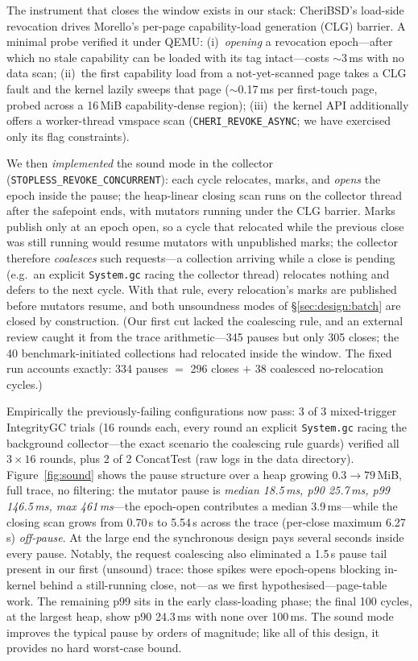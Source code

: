\documentclass[acmsmall,nonacm,screen]{acmart}
\begin{document}
The instrument that closes the window exists in our stack: CheriBSD's
load-side revocation drives Morello's per-page capability-load
generation (CLG) barrier. A minimal probe verified it under QEMU:
(i)~\emph{opening} a revocation epoch---after which no stale
capability can be loaded with its tag intact---costs $\sim$3\,ms
with no data scan; (ii)~the first capability load from a
not-yet-scanned page takes a CLG fault and the kernel lazily sweeps
that page ($\sim$0.17\,ms per first-touch page, probed across a
16\,MiB capability-dense region); (iii)~the kernel API additionally
offers a worker-thread vmspace scan (\texttt{CHERI\_REVOKE\_ASYNC};
we have exercised only its flag constraints).

We then \emph{implemented} the sound mode in the collector
(\texttt{STOPLESS\_REVOKE\_CONCURRENT}): each cycle relocates,
marks, and \emph{opens} the epoch inside the pause; the heap-linear
closing scan runs on the collector thread after the safepoint ends,
with mutators running under the CLG barrier. Marks publish only at an
epoch open, so a cycle that relocated while the previous close was
still running would resume mutators with unpublished marks; the
collector therefore \emph{coalesces} such requests---a collection
arriving while a close is pending (e.g.\ an explicit
\texttt{System.gc} racing the collector thread) relocates nothing and
defers to the next cycle. With that rule, every relocation's marks are
published before mutators resume, and both unsoundness modes of
\S\ref{sec:design:batch} are closed by construction. (Our first cut
lacked the coalescing rule, and an external review caught it from the
trace arithmetic---345 pauses but only 305 closes; the 40
benchmark-initiated collections had relocated inside the window. The
fixed run accounts exactly: 334 pauses $=$ 296 closes $+$ 38 coalesced
no-relocation cycles.)

Empirically the previously-failing configurations now pass: 3 of 3
mixed-trigger \textsf{IntegrityGC} trials (16 rounds each, every round
an explicit \texttt{System.gc} racing the background collector---the
exact scenario the coalescing rule guards) verified all
$3\times16$ rounds, plus 2 of 2 \textsf{ConcatTest} (raw logs in the
data directory). Figure~\ref{fig:sound} shows the pause structure
over a heap growing $0.3\to79$\,MiB, full trace, no filtering: the
mutator pause is \emph{median 18.5\,ms, p90 25.7\,ms, p99
146.5\,ms, max 461\,ms}---the epoch-open contributes a median
3.9\,ms---while the closing scan grows from 0.70\,s to 5.54\,s
across the trace (per-close maximum 6.27\,s) \emph{off-pause}. At the large end the synchronous design pays
several seconds inside every pause. Notably, the request coalescing
also eliminated a 1.5\,s pause tail present in our first
(unsound) trace: those spikes were epoch-opens blocking in-kernel
behind a still-running close, not---as we first
hypothesised---page-table work. The remaining p99 sits in the early
class-loading phase; the final 100 cycles, at the largest heap, show
p90 24.3\,ms with none over 100\,ms. The sound mode improves the
typical pause by orders of magnitude; like all of this design, it
provides no hard worst-case bound.
\end{document}
